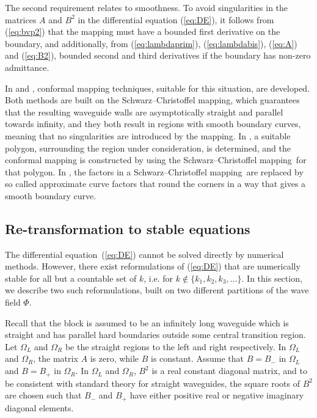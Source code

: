 \documentclass[numreferences]{kluwer}
\renewcommand{\Phi}{\varPhi}
\renewcommand{\vec}[1]{\bm{#1}}
\newcommand{\scm}{Schwarz--Chris\-tof\-fel mapping}
\renewcommand{\Phi}{\varPhi}
\begin{document}
The second requirement relates to smoothness. To avoid singularities
in the matrices $A$ and $B^2$ in the differential equation
(\ref{eq:DE}), it follows from (\ref{eq:bvp2}) that the mapping must
have a bounded first derivative on the boundary, and additionally,
from (\ref{eq:lambdaprim}), (\ref{eq:lambdabis}), (\ref{eq:A}) and
(\ref{eq:B2}), bounded second and third derivatives if the boundary
has non-zero admittance.

In \cite{andersson-outpol:2008} and \cite{andersson-acf:2009},
conformal mapping techniques, suitable for this situation, are
developed. Both methods are built on the \scm, which guarantees that
the resulting waveguide walls are asymptotically straight and parallel
towards infinity, and they both result in regions with smooth boundary
curves, meaning that no singularities are introduced by the
mapping. In \cite{andersson-outpol:2008}, a suitable polygon,
surrounding the region under consideration, is determined, and the
conformal mapping is constructed by using the \scm\ for that
polygon. In \cite{andersson-acf:2009}, the factors in a \scm\ are
replaced by so called approximate curve factors that round the corners
in a way that gives a smooth boundary curve.

\subsection{Re-transformation to stable equations}
\label{sec:stableeq}
The differential equation~(\ref{eq:DE}) cannot be solved directly by
numerical methods. However, there exist reformulations of
(\ref{eq:DE}) that are numerically stable for all but a countable set
of $k$, i.e. for $k\notin\{k_1,k_2,k_3,\dots\}$. In this section, we
describe two such reformulations, built on two different partitions of
the wave field $\vec\Phi$.

Recall that the block is assumed to be an infinitely long waveguide
which is straight and has parallel hard boundaries outside some
central transition region. Let $\Omega_L$ and $\Omega_R$ be the
straight regions to the left and right respectively.  In $\Omega_L$
and $\Omega_R$, the matrix $A$ is zero, while $B$ is constant. Assume
that $B=B_-$ in $\Omega_L$ and $B=B_+$ in $\Omega_R$. In $\Omega_L$
and $\Omega_R$, $B^2$ is a real constant diagonal matrix, and to be
consistent with standard theory for straight waveguides, the square
roots of $B^2$ are chosen such that $B_-$ and $B_+$ have either
positive real or negative imaginary diagonal elements.
\end{document}
